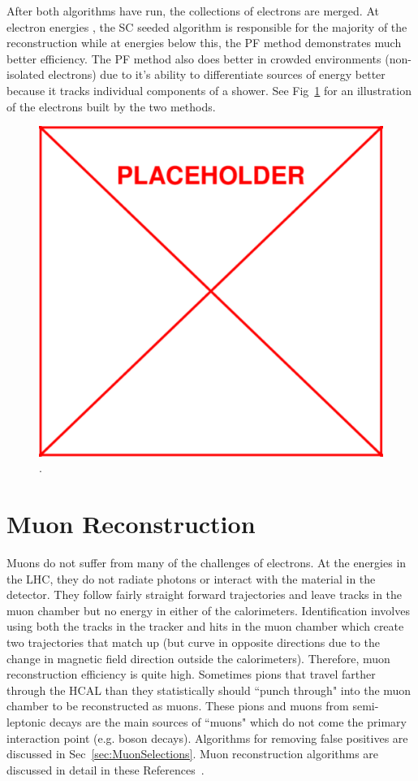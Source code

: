 	After both algorithms have run, the collections of electrons are merged. At electron energies  \GeV, the SC seeded algorithm is responsible for the majority of the reconstruction while at energies below this, the PF method demonstrates much better efficiency. The PF method also does better in crowded environments (non-isolated electrons) due to it's ability to differentiate sources of energy better because it tracks individual components of a shower. See Fig~\ref{fig:electron_reconstruction} for an illustration of the electrons built by the two methods.\\
	
	
		\begin{figure}[h]
\begin{center}
\includegraphics[width=0.48\linewidth]{Figs/placeholder.pdf}
\caption{\label{fig:electron_reconstruction}
.
}
\end{center}
\end{figure}
	
	
	
	
	
	
	\section{Muon Reconstruction}
	Muons do not suffer from many of the challenges of electrons. At the energies in the LHC, they do not radiate photons or interact with the material in the detector. They follow fairly straight forward trajectories and leave tracks in the muon chamber but no energy in either of the calorimeters. Identification involves using both the tracks in the tracker and hits in the muon chamber which create two trajectories that match up (but curve in opposite directions due to the change in magnetic field direction outside the calorimeters). Therefore, muon reconstruction efficiency is quite high. Sometimes pions that travel farther through the HCAL than they statistically should ``punch through" into the muon chamber to be reconstructed as muons. These pions and muons from semi-leptonic decays are the main sources of ``muons" which do not come the primary interaction point (e.g. boson decays). Algorithms for removing false positives are discussed in Sec~\ref{sec:MuonSelections}. Muon reconstruction algorithms are discussed in detail in these References~\cite{muontdr,muonReco}.\\
	
